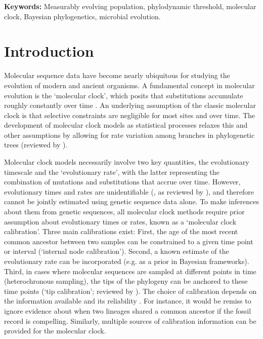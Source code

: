 \documentclass[11pt]{article}
\begin{document}
\textbf{Keywords:} Measurably evolving population, phylodynamic threshold, molecular clock, Bayesian phylogenetics, microbial evolution.



\section{Introduction}
Molecular sequence data have become nearly ubiquitous for studying the evolution of modern and ancient organisms. A fundamental concept in molecular evolution is the `molecular clock', which posits that substitutions accumulate roughly constantly over time \citep{zuckerkandl1965evolutionary}. An underlying assumption of the classic molecular clock is that selective constraints are negligible for most sites and over time. The development of molecular clock models as statistical processes relaxes this and other assumptions by allowing for rate variation among branches in phylogenetic trees (reviewed by \cite{ho2014molecular, guindon2020rates}).

Molecular clock models necessarily involve two key quantities, the evolutionary timescale and the `evolutionary rate', with the latter representing the combination of mutations and substitutions that accrue over time. However, evolutionary times and rates are unidentifiable (\cite{dos2013unbearable}, as reviewed by \cite{bromham2018bayesian}), and therefore cannot be jointly estimated using genetic sequence data alone. To make inferences about them from genetic sequences, all molecular clock methods require prior assumption about evolutionary times or rates, known as a `molecular clock calibration'. Three main calibrations exist: First, the age of the most recent common ancestor between two samples can be constrained to a given time point or interval (`internal node calibration'). Second, a known estimate of the evolutionary rate can be incorporated (e.g. as a prior in Bayesian frameworks). Third, in cases where molecular sequences are sampled at different points in time (heterochronous sampling), the tips of the phylogeny can be anchored to these time points (`tip calibration'; reviewed by \cite{rieux2016inferences}). The choice of calibration depends on the information available and its reliability \citep{warnock2012exploring, duchene2014impact}. For instance, it would be remiss to ignore evidence about when two lineages shared a common ancestor if the fossil record is compelling. Similarly, multiple sources of calibration information can be provided for the molecular clock.
\end{document}
